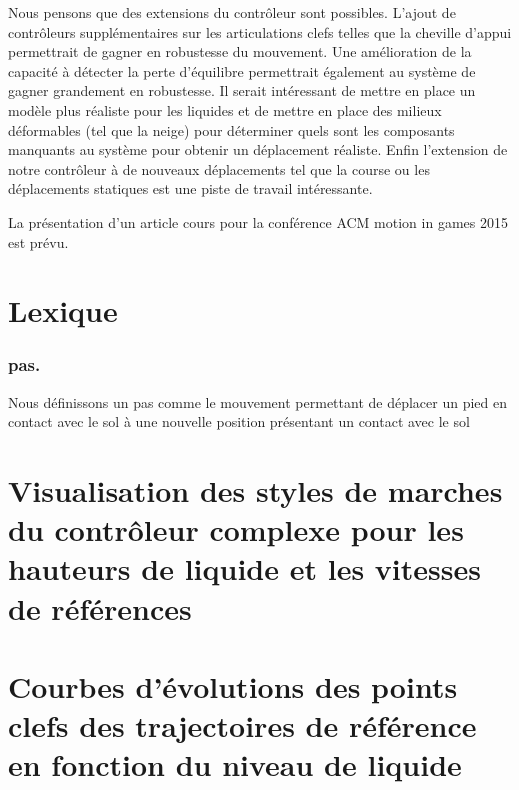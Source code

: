 \documentclass[runningheads,a4paper]{llncs}
\begin{document}
Nous pensons que des extensions du contrôleur sont possibles. L'ajout de contrôleurs supplémentaires sur les articulations clefs telles que la cheville d'appui permettrait de gagner en robustesse du mouvement. Une amélioration de la capacité à détecter la perte d'équilibre permettrait également au système de gagner grandement en robustesse. Il serait intéressant de mettre en place un modèle plus réaliste pour les liquides et de mettre en place des milieux déformables (tel que la neige) pour déterminer quels sont les composants manquants au système pour obtenir un déplacement réaliste. Enfin l'extension de notre contrôleur à de nouveaux déplacements tel que la course ou les déplacements statiques est une piste de travail intéressante. 

La présentation d'un article cours pour la conférence ACM motion in games 2015 est prévu.
%



%
\nocite{*}


%
\newpage

\appendix
\section{Lexique}
\label{sec:lexique}
\subsubsection{pas.} Nous définissons un pas comme le mouvement permettant de déplacer un pied en contact avec le sol à une nouvelle position présentant un contact avec le sol


\section{Visualisation des styles de marches du contrôleur complexe pour les hauteurs de liquide et les vitesses de références}
\label{sec:complex_controler}

\section{Courbes d'évolutions des points clefs des trajectoires de référence en fonction du niveau de liquide}
\label{sec:evo_key_points_with_wlvl}
\end{document}
